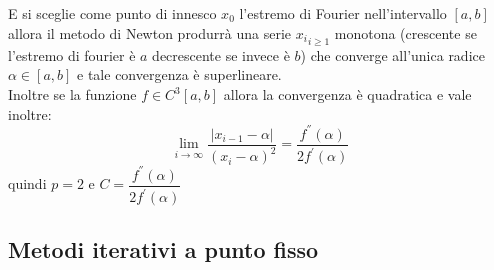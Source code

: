 \documentclass[12pt, a4paper]{book}
\theoremstyle{definition}
\begin{document}
\begin{flushleft}
E si sceglie come punto di innesco $x_{0}$ l'estremo di Fourier nell'intervallo $[a,b]$ allora il metodo di Newton produrrà una serie ${x_{i}}_{i \geq 1}$ monotona (crescente se l'estremo di fourier è $a$ decrescente se invece è $b$) che converge all'unica radice $\alpha \in [a,b]$ e tale convergenza è superlineare.\\
\vspace{1em}
Inoltre se la funzione $f \in C^{3}[a,b]$  allora la convergenza è quadratica e vale inoltre: 
\[ 
	\lim_{i \rightarrow \infty} \frac{|x_{i-1} - \alpha|}{(x_{i} - \alpha)^{2}} = \dfrac{f^{''}(\alpha)}{2f^{'}(\alpha)}
\]
quindi $p = 2$ e $C = \dfrac{f^{''}(\alpha)}{2f^{'}(\alpha)}$
\end{flushleft}

\subsection{ Metodi iterativi a punto fisso}
\end{document}
